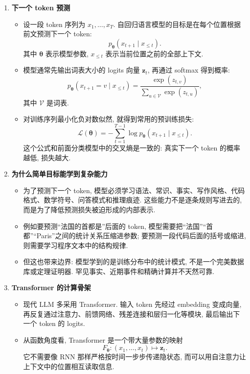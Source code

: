 \documentclass{../nndlcourse}
\begin{document}
\begin{enumerate}
  \item \textbf{下一个 token 预测}
    \begin{itemize}
      \item 设一段 token 序列为 $x_1,\ldots,x_T$. 自回归语言模型的目标是在每个位置根据前文预测下一个 token:
      \[
        p_{\boldsymbol{\theta}}(x_{t+1}\mid x_{\le t}).
      \]
      其中 $\boldsymbol{\theta}$ 表示模型参数, $x_{\le t}$ 表示当前位置之前的全部上下文.
      \item 模型通常先输出词表大小的 logits 向量 $\boldsymbol{z}_t$, 再通过 softmax 得到概率:
      \[
        p_{\boldsymbol{\theta}}(x_{t+1}=v\mid x_{\le t})
        =
        \frac{\exp(z_{t,v})}{\sum_{u\in\mathcal{V}}\exp(z_{t,u})},
      \]
      其中 $\mathcal{V}$ 是词表.
      \item 对训练序列最小化负对数似然, 就得到常用的预训练损失:
      \[
        \mathcal{L}(\boldsymbol{\theta})
        =
        -\sum_{t=1}^{T-1}
        \log p_{\boldsymbol{\theta}}(x_{t+1}\mid x_{\le t}).
      \]
      这个公式和前面分类模型中的交叉熵是一致的: 真实下一个 token 的概率越低, 损失越大.
    \end{itemize}
  \item \textbf{为什么简单目标能学到复杂能力}
    \begin{itemize}
      \item 为了预测下一个 token, 模型必须学习语法、常识、事实、写作风格、代码格式、数学符号、问答模式和推理痕迹. 这些能力不是逐条规则写进去的, 而是为了降低预测损失被迫形成的内部表示.
      \item 例如要预测“法国的首都是”后面的 token, 模型需要把“法国”“首都”“Paris”之间的统计关系压缩进参数; 要预测一段代码后面的括号或缩进, 则需要学习程序文本中的结构规律.
      \item 但这也带来边界: 模型学到的是训练分布中的统计模式, 不是一个完美数据库或定理证明器. 罕见事实、近期事件和精确计算并不天然可靠.
    \end{itemize}
  \item \textbf{Transformer 的计算骨架}
    \begin{itemize}
      \item 现代 LLM 多采用 Transformer. 输入 token 先经过 embedding 变成向量, 再反复通过注意力、前馈网络、残差连接和层归一化等模块, 最后输出下一个 token 的 logits.
      \item 从函数角度看, Transformer 是一个带大量参数的映射
      \[
        F_{\boldsymbol{\theta}}:(x_1,\ldots,x_t)\mapsto \boldsymbol{z}_t.
      \]
      它不需要像 RNN 那样严格按时间一步步传递隐状态, 而可以用自注意力让上下文中的位置相互读取信息.

\end{itemize}
\end{enumerate}
\end{document}
